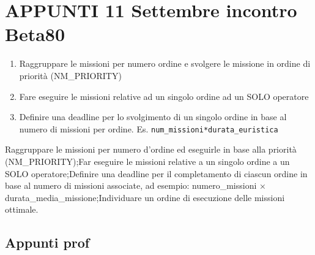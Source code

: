 \section{APPUNTI 11 Settembre incontro Beta80}
\begin{enumerate}
	\item Raggruppare le missioni per numero ordine e svolgere le missione in ordine di priorità (NM\_PRIORITY)
	\item Fare eseguire le missioni relative ad un singolo ordine ad un SOLO operatore
	\item Definire una deadline per lo svolgimento di un singolo ordine in base al numero di missioni per ordine. Es. \texttt{num\_missioni*durata\_euristica}
\end{enumerate}
Raggruppare le missioni per numero d'ordine ed eseguirle in base alla priorità (NM\_PRIORITY);Far eseguire le missioni relative a un singolo ordine a un SOLO operatore;Definire una deadline per il completamento di ciascun ordine in base al numero di missioni associate, ad esempio:
numero\_missioni × durata\_media\_missione;Individuare un ordine di esecuzione delle missioni ottimale.

\subsection{Appunti prof}

